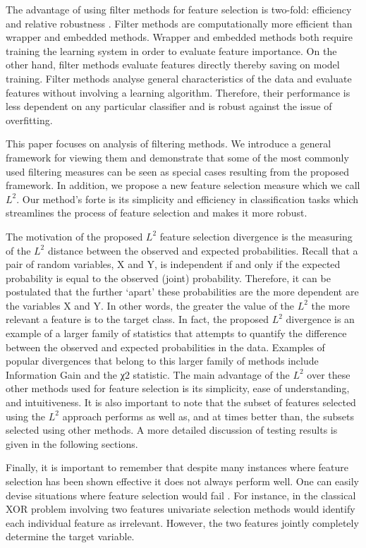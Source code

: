 \documentclass[review]{elsarticle}
\begin{document}
The advantage of using filter methods for feature selection is two-fold: efficiency and relative robustness \cite{Witten2011,Shahamiri2014a, Kamalov2019}. Filter methods are computationally more efficient than wrapper and embedded methods. Wrapper and embedded methods both require training the learning system in order to evaluate feature importance. On the other hand, filter methods evaluate features directly thereby saving on model training. Filter methods analyse general characteristics of the data and evaluate features without involving a learning algorithm. Therefore, their performance is less dependent on any particular classifier and is robust against the issue of overfitting. 

This paper focuses on analysis of filtering methods. We introduce a general framework for viewing them and demonstrate that some of the most commonly used filtering measures can be seen as special cases resulting from the proposed framework. In addition, we propose a new feature selection measure which we call $ L^2 $. Our method’s forte is its simplicity and efficiency in classification tasks which streamlines the process of feature selection and makes it more robust. 

The motivation of the proposed $ L^2 $ feature selection divergence is the measuring of the $ L^2 $ distance between the observed and expected probabilities. Recall that a pair of random variables, X and Y, is independent if and only if the expected probability is equal to the observed (joint) probability. Therefore, it can be postulated that the further ‘apart’ these probabilities are the more dependent are the variables X and Y. In other words, the greater the value of the $ L^2 $ the more relevant a feature is to the target class. In fact, the proposed $ L^2 $ divergence is an example of a larger family of statistics that attempts to quantify the difference between the observed and expected probabilities in the data. Examples of popular divergences that belong to this larger family of methods include Information Gain and the χ2 statistic. The main advantage of the $ L^2 $ over these other methods used for feature selection is its simplicity, ease of understanding, and intuitiveness. It is also important to note that the subset of features selected using the $ L^2 $ approach performs as well as, and at times better than, the subsets selected using other methods. A more detailed discussion of testing results is given in the following sections. 

Finally, it is important to remember that despite many instances where feature selection has been shown effective it does not always perform well. One can easily devise situations where feature selection would fail \cite{Li2017}. For instance, in the classical XOR problem involving two features univariate selection methods would identify each individual feature as irrelevant. However, the two features jointly completely determine the target variable. 
\end{document}
